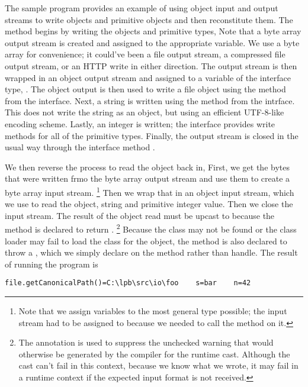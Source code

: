 The sample program  provides an example of using object
input and output streams to write objects and primitive objects and
then reconstitute them.  The  method begins by writing
the objects and primitive types,
%
%
Note that a byte array output stream is created and assigned to the
appropriate variable.  We use a byte array for convenience; it
could've been a file output stream, a compressed file output stream,
or an HTTP write in either direction.  The output stream is then
wrapped in an object output stream and assigned to a variable of the
interface type, .  The object output is then used
to write a file object using the  method from the
 interface.  Next, a string is written using the
 method from the  intrface.
This does not write the string as an object, but using an efficient
UTF-8-like encoding scheme.  Lastly, an integer is written; the
 interface provides write methods for all of the
primitive types.  Finally, the output stream is closed in the usual
way through the  interface method .

We then reverse the process to read the object back in,
%
%
First, we get the bytes that were written frmo the byte array
output stream and use them to create a byte array input stream.%
%
\footnote{Note that we assign variables to the most general type possible;
the input stream had to be assigned to 
because we needed to call the  method on it.}
%
Then we wrap that in an object input stream, which we use to read the
object, string and primitive integer value.  Then we close the input
stream.  The result of the object read must be upcast to 
because the  method is declared to return
.%
%
\footnote{The \code{\@SuppressWarnings} annotation is used 
to suppress the unchecked warning that would otherwise be generated
by the compiler for the runtime cast.  Although the cast can't
fail in this context, because we know what we wrote, it may fail
in a runtime context if the expected input format is not received.}
%
Because the class may not be found or the class loader may fail to
load the class for the object, the  method is also
declared to throw a , which we simply
declare on the  method rather than handle.
%
The result of running the program is
%
\begin{verbatim}
file.getCanonicalPath()=C:\lpb\src\io\foo    s=bar    n=42
\end{verbatim}


